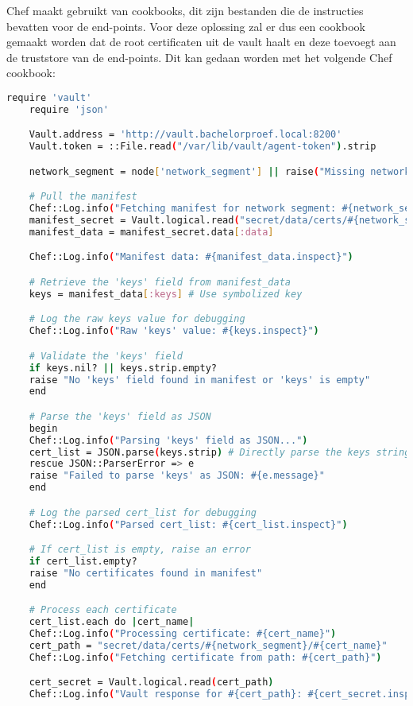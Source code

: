 Chef maakt gebruikt van cookbooks, dit zijn bestanden die de instructies bevatten voor de end-points. Voor deze oplossing zal er dus een cookbook gemaakt worden dat de root certificaten uit de vault haalt en deze toevoegt aan de truststore van de end-points. Dit kan gedaan worden met het volgende Chef cookbook:
\begin{lstlisting}[language=bash]
    require 'vault'
    require 'json'

    Vault.address = 'http://vault.bachelorproef.local:8200'
    Vault.token = ::File.read("/var/lib/vault/agent-token").strip

    network_segment = node['network_segment'] || raise("Missing network_segment attribute")

    # Pull the manifest
    Chef::Log.info("Fetching manifest for network segment: #{network_segment}")
    manifest_secret = Vault.logical.read("secret/data/certs/#{network_segment}/_manifest")
    manifest_data = manifest_secret.data[:data]

    Chef::Log.info("Manifest data: #{manifest_data.inspect}")

    # Retrieve the 'keys' field from manifest_data
    keys = manifest_data[:keys] # Use symbolized key

    # Log the raw keys value for debugging
    Chef::Log.info("Raw 'keys' value: #{keys.inspect}")

    # Validate the 'keys' field
    if keys.nil? || keys.strip.empty?
    raise "No 'keys' field found in manifest or 'keys' is empty"
    end

    # Parse the 'keys' field as JSON
    begin
    Chef::Log.info("Parsing 'keys' field as JSON...")
    cert_list = JSON.parse(keys.strip) # Directly parse the keys string as JSON after stripping whitespace
    rescue JSON::ParserError => e
    raise "Failed to parse 'keys' as JSON: #{e.message}"
    end

    # Log the parsed cert_list for debugging
    Chef::Log.info("Parsed cert_list: #{cert_list.inspect}")

    # If cert_list is empty, raise an error
    if cert_list.empty?
    raise "No certificates found in manifest"
    end

    # Process each certificate
    cert_list.each do |cert_name|
    Chef::Log.info("Processing certificate: #{cert_name}")
    cert_path = "secret/data/certs/#{network_segment}/#{cert_name}"
    Chef::Log.info("Fetching certificate from path: #{cert_path}")

    cert_secret = Vault.logical.read(cert_path)
    Chef::Log.info("Vault response for #{cert_path}: #{cert_secret.inspect}")


\end{lstlisting}
